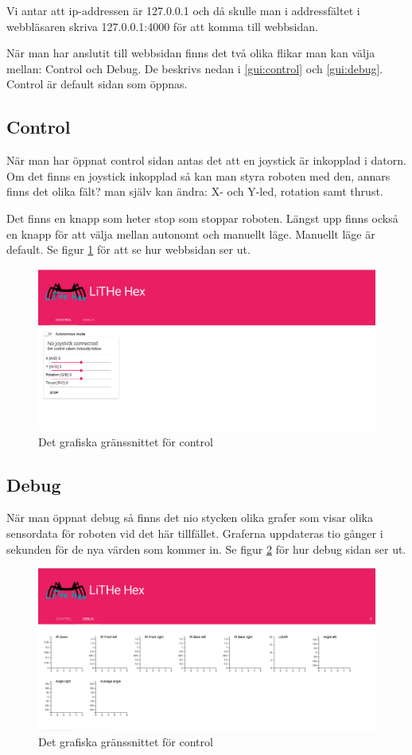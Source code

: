 \documentclass[a4paper,titlepage,12pt]{article}
\begin{document}
	Vi antar att ip-addressen är 127.0.0.1 och då skulle man i addressfältet i webbläsaren skriva
	127.0.0.1:4000 för att komma till webbsidan.
	
	När man har anslutit till webbsidan finns det två olika flikar man kan välja mellan: Control och Debug. De beskrivs nedan i \ref{gui:control} och \ref{gui:debug}. Control är default sidan som öppnas.
	
	\label{gui:control}
	\subsection{Control}
	När man har öppnat control sidan antas det att en joystick är inkopplad i datorn. Om det finns en joystick inkopplad så kan man styra roboten med den, annars finns det olika fält? man själv kan ändra: X- och Y-led, rotation samt thrust.
	
	Det finns en knapp som heter stop som stoppar roboten. Längst upp finns också en knapp för att välja mellan autonomt och manuellt läge. Manuellt läge är default. Se figur \ref{fig:gui-front} för att se hur webbsidan ser ut.
	
	\begin{figure}[h]
		\centering
		\includegraphics[width=0.5\linewidth]{images/gui-front.png}
		\caption{Det grafiska gränssnittet för control\label{fig:gui-front}}
	\end{figure}
	
	\label{gui:debug}
	\subsection{Debug}
	När man öppnat debug så finns det nio stycken olika grafer som visar olika sensordata för roboten vid det här tillfället. Graferna uppdateras tio gånger i sekunden för de nya värden som kommer in. Se figur \ref{fig:gui-debug} för hur debug sidan ser ut.
	
	\begin{figure}[h]
		\centering
		\includegraphics[width=0.5\linewidth]{images/gui-debug.png}
		\caption{Det grafiska gränssnittet för control\label{fig:gui-debug}}
	\end{figure}
	
\end{document}
